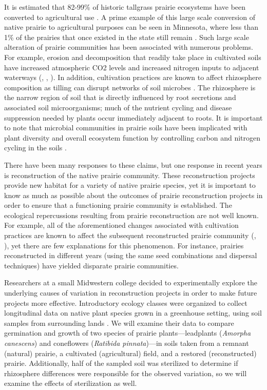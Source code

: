 \documentclass[
]{krantz}
\begin{document}
It is estimated that 82-99\% of historic tallgrass prairie ecosystems have been converted to agricultural use \citep{Baer2002}. A prime example of this large scale conversion of native prairie to agricultural purposes can be seen in Minnesota, where less than 1\% of the prairies that once existed in the state still remain \citep{Camill2004}. Such large scale alteration of prairie communities has been associated with numerous problems. For example, erosion and decomposition that readily take place in cultivated soils have increased atmospheric CO2 levels and increased nitrogen inputs to adjacent waterways (\citet{Baer2002}, \citet{Camill2004}, \citet{Knops2000}). In addition, cultivation practices are known to affect rhizosphere composition as tilling can disrupt networks of soil microbes \citep{Allison2005}. The rhizosphere is the narrow region of soil that is directly influenced by root secretions and associated soil microorganisms; much of the nutrient cycling and disease suppression needed by plants occur immediately adjacent to roots. It is important to note that microbial communities in prairie soils have been implicated with plant diversity and overall ecosystem function by controlling carbon and nitrogen cycling in the soils \citep{Zak2003}.

There have been many responses to these claims, but one response in recent years is reconstruction of the native prairie community. These reconstruction projects provide new habitat for a variety of native prairie species, yet it is important to know as much as possible about the outcomes of prairie reconstruction projects in order to ensure that a functioning prairie community is established. The ecological repercussions resulting from prairie reconstruction are not well known. For example, all of the aforementioned changes associated with cultivation practices are known to affect the subsequent reconstructed prairie community (\citet{Baer2002}, \citet{Camill2004}), yet there are few explanations for this phenomenon. For instance, prairies reconstructed in different years (using the same seed combinations and dispersal techniques) have yielded disparate prairie communities.

Researchers at a small Midwestern college decided to experimentally explore the underlying causes of variation in reconstruction projects in order to make future projects more effective. Introductory ecology classes were organized to collect longitudinal data on native plant species grown in a greenhouse setting, using soil samples from surrounding lands \citep{Angell2010}. We will examine their data to compare germination and growth of two species of prairie plants---leadplants (\emph{Amorpha canescens}) and coneflowers (\emph{Ratibida pinnata})---in soils taken from a remnant (natural) prairie, a cultivated (agricultural) field, and a restored (reconstructed) prairie. Additionally, half of the sampled soil was sterilized to determine if rhizosphere differences were responsible for the observed variation, so we will examine the effects of sterilization as well.
\end{document}
